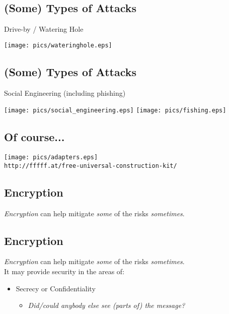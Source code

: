 \documentclass[xga]{xdvislides}
\begin{document}
\subsection{(Some) Types of Attacks}
Drive-by / Watering Hole \\

\begin{center}
	\texttt{[image: pics/wateringhole.eps]}
\end{center}



\subsection{(Some) Types of Attacks}
Social Engineering (including phishing)
\begin{center}
	\texttt{[image: pics/social\_engineering.eps]}
	\texttt{[image: pics/fishing.eps]}
\end{center}

\subsection{Of course...}
\vspace*{\fill}
\begin{center}
	\texttt{[image: pics/adapters.eps]}  \\
	\verb+http://fffff.at/free-universal-construction-kit/+ \\
\end{center}
\vspace*{\fill}

\subsection{Encryption}
{\em Encryption} can help mitigate {\em some} of the risks {\em sometimes}.

\subsection{Encryption}
{\em Encryption} can help mitigate {\em some} of the risks {\em sometimes}.
\\

It may provide security in the areas of:
\begin{itemize}
	\item Secrecy or Confidentiality
		\begin{itemize}
			\item {\em Did/could anybody else see (parts of) the message?}
		\end{itemize}
\end{itemize}
\end{document}
